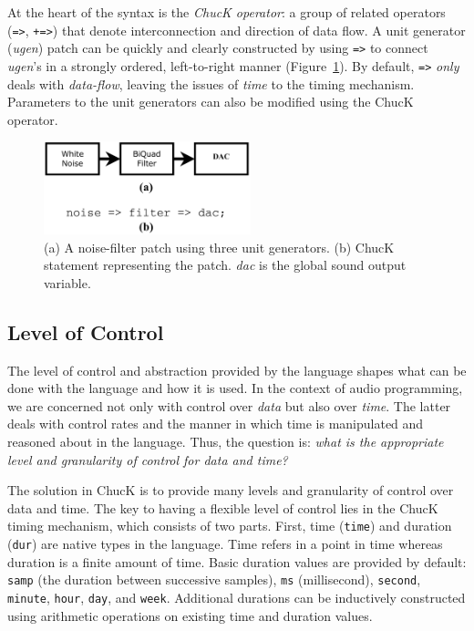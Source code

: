 At the heart of the syntax is the \textit{ChucK operator}: a group of related
operators (\texttt{=>}, \texttt{+=>}) that denote interconnection
and direction of data flow.  A unit generator (\textit{ugen}) patch can be
quickly and clearly constructed by using \texttt{=>} to connect
\textit{ugen}'s in a strongly ordered, left-to-right manner (Figure~\ref{Wang:img-2}).  By
default,  \texttt{\texttt{=>}} \textit{only} deals with
\textit{data-flow}, leaving the issues of \textit{time }to the timing mechanism. 
Parameters to the unit generators can also be modified using the ChucK operator.


\begin{figure}[t]
\centering
\includegraphics[width=60mm]{fig2.png}
\caption{(a) A noise-filter patch using three unit generators. (b) ChucK statement representing the patch.  \textit{dac} is the global sound output variable.}
\label{Wang:img-2}
\end{figure}


\subsection{Level of Control}

The level of control and abstraction provided by the language shapes what can be done with the language and how it is used.  In the context of audio programming, we are concerned not only with control over \textit{data} but also over \textit{time}.  The latter deals with control rates and the manner in which time is manipulated and reasoned about in the language.  Thus, the question is: \textit{what is the appropriate level and granularity of control for data and time?}

The solution in ChucK is to provide many levels and granularity of control over data and time.  The key to having a flexible level of control lies in the ChucK timing mechanism, which consists of two parts.  First, time (\verb!time!) and duration (\verb!dur!) are native types in the language. Time refers in a point in time whereas duration is a finite amount of time. Basic duration values are provided by default: \verb!samp! (the duration between successive samples), \verb!ms! (millisecond), \verb!second!, \verb!minute!, \verb!hour!, \verb!day!, and \verb!week!.  Additional durations can be inductively constructed using arithmetic operations on existing time and duration values.

